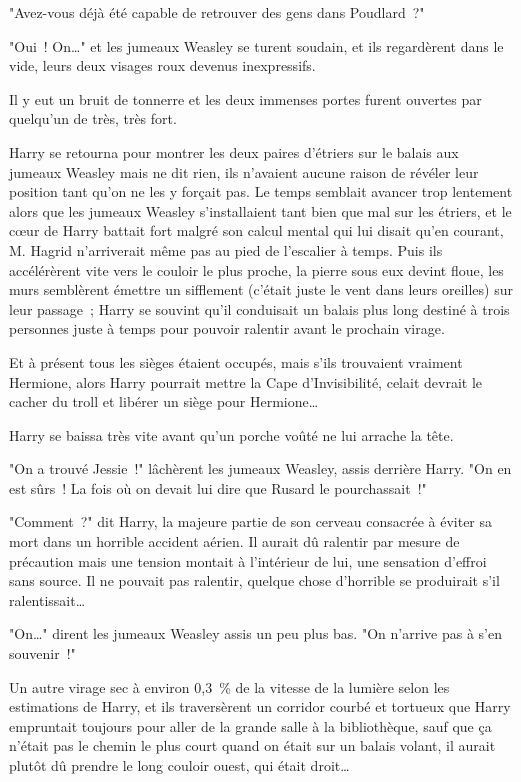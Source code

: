 "Avez-vous déjà été capable de retrouver des gens dans Poudlard~?"

"Oui~! On…" et les jumeaux Weasley se turent soudain, et ils regardèrent dans le vide, leurs deux visages roux devenus inexpressifs.

Il y eut un bruit de tonnerre et les deux immenses portes furent ouvertes par quelqu'un de très, très fort.

Harry se retourna pour montrer les deux paires d'étriers sur le balais aux jumeaux Weasley mais ne dit rien, ils n'avaient aucune raison de révéler leur position tant qu'on ne les y forçait pas. Le temps semblait avancer trop lentement alors que les jumeaux Weasley s'installaient tant bien que mal sur les étriers, et le cœur de Harry battait fort malgré son calcul mental qui lui disait qu'en courant, M. Hagrid n'arriverait même pas au pied de l'escalier à temps. Puis ils accélérèrent vite vers le couloir le plus proche, la pierre sous eux devint floue, les murs semblèrent émettre un sifflement (c'était juste le vent dans leurs oreilles) sur leur passage~; Harry se souvint qu'il conduisait un balais plus long destiné à trois personnes juste à temps pour pouvoir ralentir avant le prochain virage.

Et à présent tous les sièges étaient occupés, mais s'ils trouvaient vraiment Hermione, alors Harry pourrait mettre la Cape d'Invisibilité, celait devrait le cacher du troll et libérer un siège pour Hermione…

Harry se baissa très vite avant qu'un porche voûté ne lui arrache la tête.

"On a trouvé Jessie~!" lâchèrent les jumeaux Weasley, assis derrière Harry. "On en est sûrs~! La fois où on devait lui dire que Rusard le pourchassait~!"

"Comment~?" dit Harry, la majeure partie de son cerveau consacrée à éviter sa mort dans un horrible accident aérien. Il aurait dû ralentir par mesure de précaution mais une tension montait à l'intérieur de lui, une sensation d'effroi sans source. Il ne pouvait pas ralentir, quelque chose d'horrible se produirait s'il ralentissait…

"On…" dirent les jumeaux Weasley assis un peu plus bas. "On n'arrive pas à s'en souvenir~!"

Un autre virage sec à environ 0,3~\% de la vitesse de la lumière selon les estimations de Harry, et ils traversèrent un corridor courbé et tortueux que Harry empruntait toujours pour aller de la grande salle à la bibliothèque, sauf que ça n'était pas le chemin le plus court quand on était sur un balais volant, il aurait plutôt dû prendre le long couloir ouest, qui était droit…

